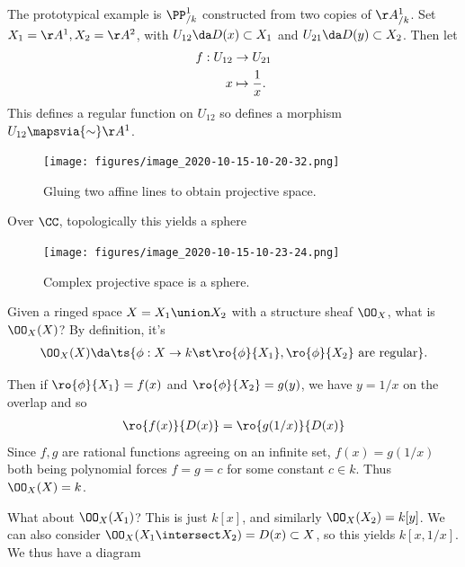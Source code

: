 \begin{example}

The prototypical example is \(\PP^1_{/k}\) constructed from two copies
of \(\AA^1_{/k}\). Set \(X_1 = \AA^1, X_2 = \AA^2\), with
\(U_{12} \da D(x) \subset X_1\) and \(U_{21} \da D(y) \subset X_2\).
Then let
\begin{align*}  
f: U_{12} &\to U_{21} \\
x & \mapsto {1\over x}
.\end{align*} This defines a regular function on \(U_{12}\) so defines a
morphism \(U_{12} \mapsvia{\sim} \AA^1\).

\begin{figure}
\centering
\texttt{[image: figures/image\_2020-10-15-10-20-32.png]}
\caption{Gluing two affine lines to obtain projective space.}
\end{figure}

Over \(\CC\), topologically this yields a sphere

\begin{figure}
\centering
\texttt{[image: figures/image\_2020-10-15-10-23-24.png]}
\caption{Complex projective space is a sphere.}
\end{figure}

Given a ringed space \(X = X_1\union X_2\) with a structure sheaf
\(\OO_X\), what is \(\OO_X(X)\)? By definition, it's
\begin{align*}  
\OO_X(X) \da \ts{\phi: X\to k \st \ro{\phi}{X_1}, \ro{\phi}{X_2} \text{ are regular} }
.\end{align*}

Then if \(\ro{\phi}{X_1} = f(x)\) and \(\ro{\phi}{X_2} = g(y)\), we have
\(y=1/x\) on the overlap and so
\begin{align*}
\ro{f(x)}{D(x)} = \ro{g(1/x)}{D(x)}
\end{align*} Since \(f, g\) are rational functions agreeing on an
infinite set, \(f(x) = g(1/x)\) both being polynomial forces
\(f = g = c\) for some constant \(c \in k\). Thus \(\OO_X(X) = k\).

What about \(\OO_X(X_1)\)? This is just \(k[x]\), and similarly
\(\OO_X(X_2) = k[y]\). We can also consider
\(\OO_X(X_1\intersect X_2) = D(x) \subset X\), so this yields
\(k[x, 1/x]\). We thus have a diagram

\begin{center}
\end{center}

\end{example}

